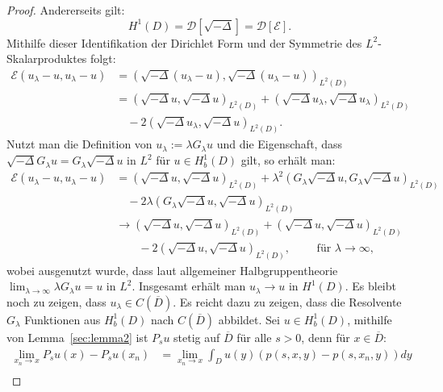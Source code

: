 \documentclass[10pt, a4paper, leqno, twoside, bibliography=totocnumbered, final]{scrartcl}
\theoremstyle{definition}
\theoremstyle{plain}%
\theoremstyle{remark}
\begin{document}
\begin{proof}
Andererseits gilt:
\begin{equation}
H^1(D) = \mathcal{D}[\sqrt{-\Delta}] = \mathcal{D}[\mathcal{E}].
\end{equation}
Mithilfe dieser Identifikation der Dirichlet Form und der Symmetrie des $L^2$-Skalarproduktes folgt:
\begin{align*}
\mathcal{E}\left(u_{\lambda} - u, u_{\lambda} - u\right) & = \left( \sqrt{-\Delta} \left(u_{\lambda} - u\right), \sqrt{-\Delta} \left(u_{\lambda} - u\right) \right)_{L^2(D)} \\
& = \left( \sqrt{-\Delta} u, \sqrt{-\Delta}  u \right)_{L^2(D)}  + \left( \sqrt{-\Delta} u_{\lambda}, \sqrt{-\Delta} u_{\lambda} \right)_{L^2(D)} \\
& \quad -2 \left( \sqrt{-\Delta} u_{\lambda}, \sqrt{-\Delta} u \right)_{L^2(D)}.
\end{align*}
Nutzt man die Definition von $ u_{\lambda} := \lambda G_{\lambda} u $ und die Eigenschaft, dass $ \sqrt{-\Delta} G_{\lambda} u = G_{\lambda} \sqrt{-\Delta} u $ in $L^2$ für $ u \in H^1_b(D) $ gilt, so erhält man:
\begin{align*}
\mathcal{E}\left(u_{\lambda} - u, u_{\lambda} - u\right) & = \left( \sqrt{-\Delta} u, \sqrt{-\Delta}  u \right)_{L^2(D)}  + \lambda^2 \left( G_{\lambda} \sqrt{-\Delta} u, G_{\lambda} \sqrt{-\Delta} u \right)_{L^2(D)} \\
& \quad -2 \lambda \left( G_{\lambda} \sqrt{-\Delta} u, \sqrt{-\Delta} u \right)_{L^2(D)} \\
& \to \left( \sqrt{-\Delta} u, \sqrt{-\Delta}  u \right)_{L^2(D)}  + \left( \sqrt{-\Delta} u, \sqrt{-\Delta} u \right)_{L^2(D)} \\
& \qquad -2 \left( \sqrt{-\Delta} u, \sqrt{-\Delta} u \right)_{L^2(D)}, \qquad \text{ für } \lambda \to \infty, 
\end{align*}
wobei ausgenutzt wurde, dass laut allgemeiner Halbgruppentheorie $ \lim_{\lambda \to \infty} \lambda G_{\lambda} u = u $ in $L^2$. Insgesamt erhält man $ u_{\lambda} \to u $ in $H^1(D)$. Es bleibt noch zu zeigen, dass $ u_{\lambda} \in C(\overline{D}) $. Es reicht dazu zu zeigen, dass die Resolvente $ G_{\lambda} $ Funktionen aus $H^1_b(D)$ nach $ C(\overline{D}) $ abbildet. Sei $u \in H^1_b(D)$, mithilfe von Lemma~\ref{sec:lemma2} ist $ P_s u $ stetig auf $ \overline{D} $ für alle $ s > 0 $, denn für $ x \in \overline{D} $:
\begin{align*}
\lim_{x_n \to x} P_s u(x) - P_s u(x_n) & = \lim_{x_n \to x} \int_D u(y) (p(s,x,y) - p(s,x_n,y)) dy \\

\end{align*}
\end{proof}
\end{document}
